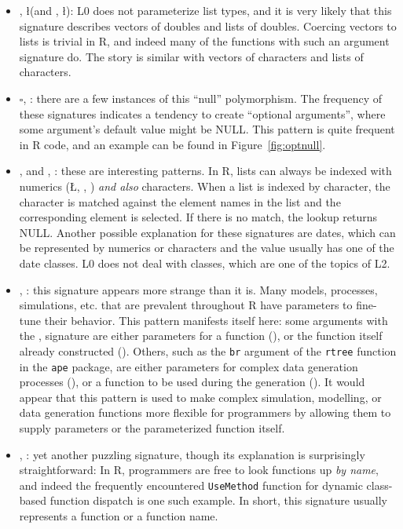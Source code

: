 \documentclass[acmsmall,10pt,review,anonymous]{acmart}\settopmatter{printfolios=true,printccs=false,printacmref=false}
\begin{document}
\begin{itemize}
\item \D, \l (and \C, \l): L0 does not parameterize list types, and it is very likely that this signature describes vectors of doubles and lists of doubles.
	Coercing vectors to lists is trivial in R, and indeed many of the functions with such an argument signature do.
	The story is similar with vectors of characters and lists of characters.
	
	\item $\square$, \sN: there are a few instances of this ``null'' polymorphism.
	The frequency of these signatures indicates a tendency to create ``optional arguments'', where some argument's default value might be NULL.
	This pattern is quite frequent in R code, and an example can be found in Figure~\ref{fig:optnull}.

	\item \C, \D and \C, \I: these are interesting patterns.
	In R, lists can always be indexed with numerics (\L, \D, \I) {\it and also} characters.
	When a list is indexed by character, the character is matched against the element names in the list and the corresponding element is selected.
	If there is no match, the lookup returns NULL.
	Another possible explanation for these signatures are dates, which can be represented by numerics or characters and the value usually has one of the date classes.
	L0 does not deal with classes, which are one of the topics of L2.

	\item \D, \sF: this signature appears more strange than it is.
	Many models, processes, simulations, etc. that are prevalent throughout R have parameters to fine-tune their behavior.
	This pattern manifests itself here: some arguments with the \D, \sF signature are either parameters for a function (\D), or the function itself already constructed (\sF).
	Others, such as the {\tt br} argument of the {\tt rtree} function in the {\tt ape} package, are either parameters for complex data generation processes (\D), or a function to be used during the generation (\sF).
	It would appear that this pattern is used to make complex simulation, modelling, or data generation functions more flexible for programmers by allowing them to supply parameters or the parameterized function itself.
	
	\item \C, \sF: yet another puzzling signature, though its explanation is surprisingly straightforward:
	In R, programmers are free to look functions up {\it by name}, and indeed the frequently encountered {\tt UseMethod} function for dynamic class-based function dispatch is one such example.
	In short, this signature usually represents a function or a function name.
\end{itemize}
\end{document}

